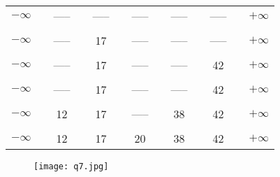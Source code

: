 \documentclass[english]{article}
\begin{document}
\begin{tabular}{ccccccccccccc}
$-\infty$ &  & ----- &  & ----- &  & ----- &  & ----- &  & ----- &  & $+\infty$\tabularnewline
          &  &       &  &       &  &       &  &       &  &       &  & \tabularnewline
$-\infty$ &  & ----- &  & 17    &  & ----- &  & ----- &  & ----- &  & $+\infty$\tabularnewline
          &  &       &  &       &  &       &  &       &  &       &  & \tabularnewline
$-\infty$ &  & ----- &  & 17    &  & ----- &  & ----- &  & 42    &  & $+\infty$\tabularnewline
          &  &       &  &       &  &       &  &       &  &       &  & \tabularnewline
$-\infty$ &  & ----- &  & 17    &  & ----- &  & ----- &  & 42    &  & $+\infty$\tabularnewline
          &  &       &  &       &  &       &  &       &  &       &  & \tabularnewline
$-\infty$ &  & 12    &  & 17    &  & ----- &  & 38    &  & 42    &  & $+\infty$\tabularnewline
          &  &       &  &       &  &       &  &       &  &       &  & \tabularnewline
$-\infty$ &  & 12    &  & 17    &  & 20    &  & 38    &  & 42    &  & $+\infty$\tabularnewline
\end{tabular} \bigskip

\begin{figure}[H]
  \centering
  \texttt{[image: q7.jpg]}
\end{figure}
\end{document}

